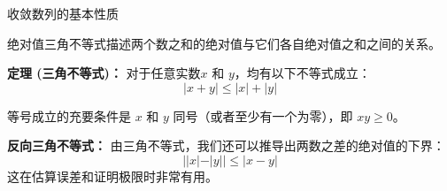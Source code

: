 \documentclass[aspectratio=169,10pt,fontset=fandol]{ctexbeamer}
\begin{document}
\begin{frame}[t,fragile]{收敛数列的基本性质}
\footnotesize
{\footnotesize
绝对值三角不等式描述两个数之和的绝对值与它们各自绝对值之和之间的关系。
	
	\textbf{定理 (三角不等式)：} 对于任意实数$x$ 和 $y$，均有以下不等式成立：
	\begin{equation*}
		|x + y| \le |x| + |y|
	\end{equation*}
	
	等号成立的充要条件是 $x$ 和 $y$ 同号（或者至少有一个为零），即 $xy \ge 0$。
	
	\textbf{反向三角不等式：} 由三角不等式，我们还可以推导出两数之差的绝对值的下界：
	\begin{equation*}
		||x| - |y|| \le |x - y|
	\end{equation*}
	这在估算误差和证明极限时非常有用。

}
\end{frame}
\end{document}
